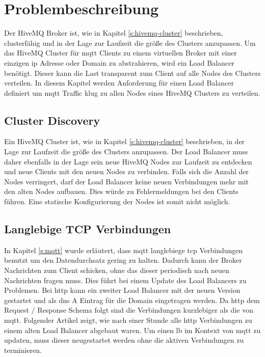 \section{Problembeschreibung}
Der HiveMQ Broker ist, wie in Kapitel \ref{s:hivemq-cluster} beschrieben, clusterfähig und in der Lage zur Laufzeit die grö{\ss}e des Clusters anzupassen.
Um das HiveMQ Cluster für \ac{mqtt} Clients zu einem virtuellen Broker mit einer einzigen \ac{ip} Adresse oder Domain zu abstrahieren, wird ein Load Balancer benötigt. Dieser kann die Last transparent zum Client auf alle Nodes des Clusters verteilen.
In diesem Kapitel werden Anforderung für einen Load Balancer definiert um \ac{mqtt} Traffic klug zu allen Nodes eines HiveMQ Clusters zu verteilen.

\subsection{Cluster Discovery}
Ein HiveMQ Cluster ist, wie in Kapitel \ref{s:hivemq-cluster} beschrieben, in der Lage zur Laufzeit die grö{\ss}e des Clusters anzupassen. Der Load Balancer muss daher ebenfalls in der Lage sein neue HiveMQ Nodes zur Laufzeit zu entdecken und neue Clients mit den neuen Nodes zu verbinden. Falls sich die Anzahl der Nodes verringert, darf der Load Balancer keine neuen Verbindungen mehr mit den alten Nodes aufbauen. Dies würde zu Fehlermeldungen bei den Clients führen.
Eine statische Konfigurierung der Nodes ist somit nicht möglich.

\subsection{Langlebige TCP Verbindungen}
In Kapitel \ref{s:mqtt} wurde erläutert, dass \ac{mqtt} langlebiege \ac{tcp} Verbindungen benutzt um den Datendurchsatz gering zu halten. Dadurch kann der Broker Nachrichten zum Client schicken, ohne das dieser periodisch nach neuen Nachrichten fragen muss.
Dies führt bei einem Update des Load Balancers zu Problemen. Bei \ac{http} kann ein zweiter Load Balancer mit der neuen Version gestartet und als \ac{dns} A Eintrag für die Domain eingetragen werden. Da \ac{http} dem Request / Response Schema folgt sind die Verbindungen kurzlebiger als die von \ac{mqtt}. Folgender Artikel zeigt, wie nach einer Stunde alle \ac{http} Verbindungen zu einem alten Load Balancer abgebaut waren.
Um einen \ac{lb} im Kontext von \ac{mqtt} zu updaten, muss dieser neugestartet werden ohne die aktiven Verbindungen zu terminieren.

